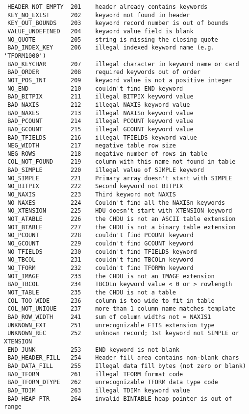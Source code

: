 \documentclass[11pt]{book}
\begin{document}
\begin{verbatim}
 HEADER_NOT_EMPTY  201    header already contains keywords
 KEY_NO_EXIST      202    keyword not found in header
 KEY_OUT_BOUNDS    203    keyword record number is out of bounds
 VALUE_UNDEFINED   204    keyword value field is blank
 NO_QUOTE          205    string is missing the closing quote
 BAD_INDEX_KEY     206    illegal indexed keyword name (e.g. 'TFORM1000')
 BAD_KEYCHAR       207    illegal character in keyword name or card
 BAD_ORDER         208    required keywords out of order
 NOT_POS_INT       209    keyword value is not a positive integer
 NO_END            210    couldn't find END keyword
 BAD_BITPIX        211    illegal BITPIX keyword value
 BAD_NAXIS         212    illegal NAXIS keyword value
 BAD_NAXES         213    illegal NAXISn keyword value
 BAD_PCOUNT        214    illegal PCOUNT keyword value
 BAD_GCOUNT        215    illegal GCOUNT keyword value
 BAD_TFIELDS       216    illegal TFIELDS keyword value
 NEG_WIDTH         217    negative table row size
 NEG_ROWS          218    negative number of rows in table
 COL_NOT_FOUND     219    column with this name not found in table
 BAD_SIMPLE        220    illegal value of SIMPLE keyword
 NO_SIMPLE         221    Primary array doesn't start with SIMPLE
 NO_BITPIX         222    Second keyword not BITPIX
 NO_NAXIS          223    Third keyword not NAXIS
 NO_NAXES          224    Couldn't find all the NAXISn keywords
 NO_XTENSION       225    HDU doesn't start with XTENSION keyword
 NOT_ATABLE        226    the CHDU is not an ASCII table extension
 NOT_BTABLE        227    the CHDU is not a binary table extension
 NO_PCOUNT         228    couldn't find PCOUNT keyword
 NO_GCOUNT         229    couldn't find GCOUNT keyword
 NO_TFIELDS        230    couldn't find TFIELDS keyword
 NO_TBCOL          231    couldn't find TBCOLn keyword
 NO_TFORM          232    couldn't find TFORMn keyword
 NOT_IMAGE         233    the CHDU is not an IMAGE extension
 BAD_TBCOL         234    TBCOLn keyword value < 0 or > rowlength
 NOT_TABLE         235    the CHDU is not a table
 COL_TOO_WIDE      236    column is too wide to fit in table
 COL_NOT_UNIQUE    237    more than 1 column name matches template
 BAD_ROW_WIDTH     241    sum of column widths not = NAXIS1
 UNKNOWN_EXT       251    unrecognizable FITS extension type
 UNKNOWN_REC       252    unknown record; 1st keyword not SIMPLE or XTENSION
 END_JUNK          253    END keyword is not blank
 BAD_HEADER_FILL   254    Header fill area contains non-blank chars
 BAD_DATA_FILL     255    Illegal data fill bytes (not zero or blank)
 BAD_TFORM         261    illegal TFORM format code
 BAD_TFORM_DTYPE   262    unrecognizable TFORM data type code
 BAD_TDIM          263    illegal TDIMn keyword value
 BAD_HEAP_PTR      264    invalid BINTABLE heap pointer is out of range


\end{verbatim}
\end{document}
